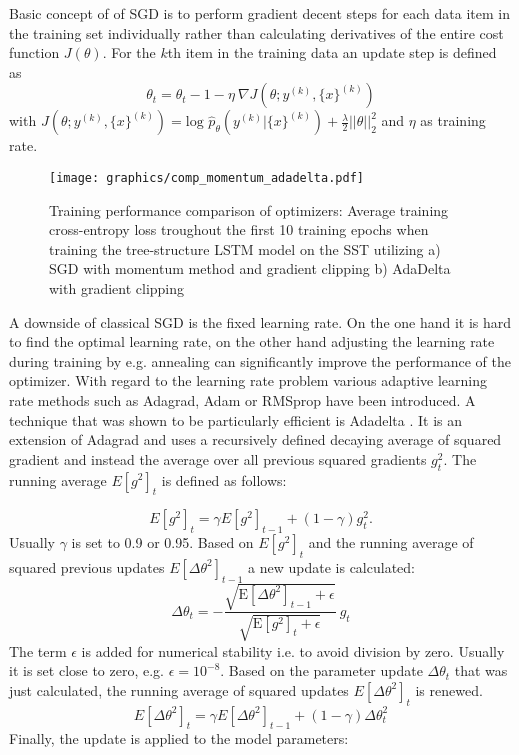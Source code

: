 \documentclass[a4paper,12pt]{article}%
\begin{document}
Basic concept of of SGD is to perform gradient decent steps for each data item in the training set individually rather than calculating derivatives of the entire cost function $J(\theta)$. For the $k$th item in the training data an update step is defined as
$$
\theta_t = \theta_t-1 - \eta ~ \nabla J(\theta; y^{(k)}, \{x\}^{(k)})
$$
with $J(\theta; y^{(k)}, \{x\}^{(k)}) = \text{log } \hat{p}_{\theta} \left(y^{(k)} | \{x\}^{(k)} \right) + \frac{\lambda}{2} \vert \vert \theta \vert \vert^2_2$ and $\eta$ as training rate.

\begin{figure}
\captionsetup{justification=centering}
\centering
\texttt{[image: graphics/comp\_momentum\_adadelta.pdf]}
\caption{Training performance comparison of optimizers: Average training cross-entropy loss troughout the first 10 training epochs when training the tree-structure LSTM model on the SST utilizing a) SGD with momentum method and gradient clipping b) AdaDelta with gradient clipping\label{fig:comp_momentum_adadelta}}
\end{figure}

A downside of classical SGD is the fixed learning rate. On the one hand it is hard to find the optimal learning rate, on the other hand adjusting the learning rate during training by e.g. annealing can significantly improve the performance of the optimizer. With regard to the learning rate problem various adaptive learning rate methods such as Adagrad, Adam or RMSprop have been introduced. A technique that was shown to be particularly efficient is Adadelta \citep{Zeiler2012}. It is an extension of Adagrad and uses a recursively defined decaying average of squared gradient and instead the average over all previous squared gradients $g_t^2$. The running average $E[g^2]_t$ is defined as follows:

$$
E[g^2]_t = \gamma E[g^2]_{t-1} + (1 - \gamma) g^2_t.
$$
Usually $\gamma$ is set to 0.9 or 0.95. Based on $E[g^2]_t$ and the running average of squared previous updates $E[\Delta \theta^2]_{t-1}$ a new update is calculated:
$$
\Delta \theta_t = -\frac{\sqrt{\mathrm{E}[\Delta \theta^2]_{t-1} + \epsilon}}{\sqrt{\mathrm{E}[g^2]_{t} + \epsilon}} ~ g_t
$$
The term $\epsilon$ is added for numerical stability i.e. to avoid division by zero. Usually it is set close to zero, e.g. $\epsilon = 10^{-8}$. Based on the parameter update $\Delta \theta_t $ that was just calculated, the running average of squared updates $E[\Delta \theta^2]_t$ is renewed.
$$
E[\Delta \theta^2]_t = \gamma E[\Delta \theta^2]_{t-1} + (1 - \gamma) \Delta \theta^2_t
$$ 
Finally, the update is applied to the model parameters:
\end{document}
